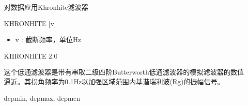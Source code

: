 \label{cmd:khronhite}

对数据应用Khronhite滤波器

\begin{SACSTX}
KHRONHITE [v]
\end{SACSTX}

\begin{itemize}
\item v : 截断频率，单位Hz
\end{itemize}

\begin{SACDFT}
KHRONHITE 2.0
\end{SACDFT}

这个低通滤波器是带有串取二级四阶Butterworth低通滤波器的模拟滤波器的数值逼近。其拐角频率为0.1Hz以加强区域范围内基谐瑞利波(Rg)的振幅信号。

depmin, depmax, depmen
